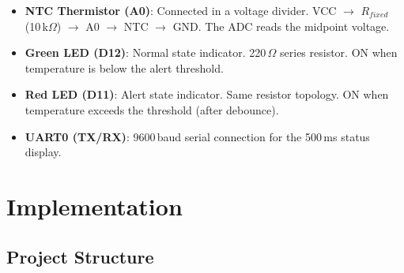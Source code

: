 \documentclass[12pt]{article}
\begin{document}
\begin{itemize}
  \item \textbf{NTC Thermistor (A0)}: Connected in a voltage divider. VCC $\to$ $R_{fixed}$ (10\,k$\Omega$) $\to$ A0 $\to$ NTC $\to$ GND. The ADC reads the midpoint voltage.
  \item \textbf{Green LED (D12)}: Normal state indicator. 220\,$\Omega$ series resistor. ON when temperature is below the alert threshold.
  \item \textbf{Red LED (D11)}: Alert state indicator. Same resistor topology. ON when temperature exceeds the threshold (after debounce).
  \item \textbf{UART0 (TX/RX)}: 9600\,baud serial connection for the 500\,ms status display.
\end{itemize}

\section{Implementation}

\subsection{Project Structure}
\end{document}
